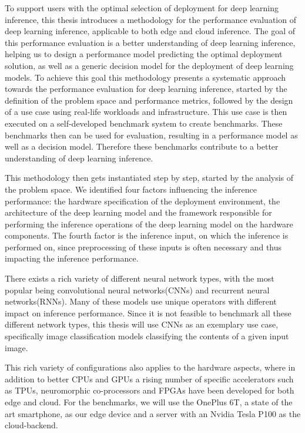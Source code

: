 To support users with the optimal selection of deployment for deep learning inference, this thesis introduces a methodology for the performance evaluation of deep learning inference, applicable to both edge and cloud inference.
The goal of this performance evaluation is a better understanding of deep learning inference, helping us to design a performance model predicting the optimal deployment solution, as well as a generic decision model for the deployment of deep learning models.
To achieve this goal this methodology presents a systematic approach towards the performance evaluation for deep learning inference, started by the definition of the problem space and performance metrics, followed by the design of a use case using real-life workloads and infrastructure. This use case is then executed on a self-developed benchmark system to create benchmarks.
These benchmarks then can be used for evaluation, resulting in a performance model as well as a decision model. Therefore these benchmarks contribute to a better understanding of deep learning inference.

This methodology then gets instantiated step by step, started by the analysis of the problem space.
We identified four factors influencing the inference performance: the hardware specification of the deployment environment, the architecture of the deep learning model and the framework responsible for performing the inference operations of the deep learning model on the hardware components. The fourth factor is the inference input, on which the inference is performed on, since preprocessing of these inputs is often necessary and thus impacting the inference performance.

There exists a rich variety of different neural network types, with the most popular being convolutional neural networks(CNNs) and recurrent neural networks(RNNs).
Many of these models use unique operators with different impact on inference performance.
Since it is not feasible to benchmark all these different network types, this thesis will use CNNs as an exemplary use case, specifically image classification models classifying the contents of a given input image.

This rich variety of configurations also applies to the hardware aspects, where in addition to better CPUs and GPUs a rising number of specific accelerators such as TPUs, neuromorphic co-processors and FPGAs have been developed for both edge and cloud.
For the benchmarks, we will use the OnePlus 6T, a state of the art smartphone, as our edge device and a server with an Nvidia Tesla P100 as the cloud-backend.

